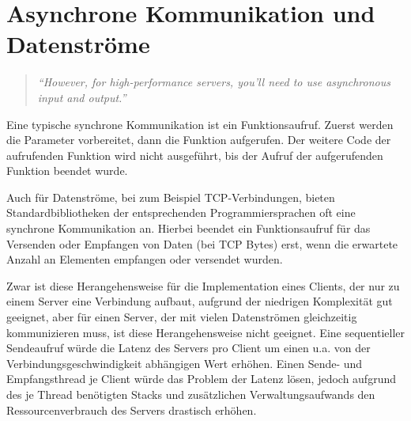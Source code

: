 	
	
	


\section{Asynchrone Kommunikation und Datenströme}

\begin{quotation}
	\textit{\enquote{However, for high-performance servers, you'll need to use asynchronous input and output.}}
	\cite[454]{rust:orly_programming}
\end{quotation}

Eine typische synchrone Kommunikation ist ein Funktionsaufruf.
Zuerst werden die Parameter vorbereitet, dann die Funktion aufgerufen.
Der weitere Code der aufrufenden Funktion wird nicht ausgeführt, bis der Aufruf der aufgerufenden Funktion beendet wurde.

Auch für Datenströme, bei zum Beispiel TCP-Verbindungen, bieten Standardbibliotheken der entsprechenden Programmiersprachen oft eine synchrone Kommunikation an.
Hierbei beendet ein Funktionsaufruf für das Versenden oder Empfangen von Daten (bei TCP Bytes) erst, wenn die erwartete Anzahl an Elementen empfangen oder versendet wurden.

Zwar ist diese Herangehensweise für die Implementation eines Clients, der nur zu einem Server eine Verbindung aufbaut, aufgrund der niedrigen Komplexität gut geeignet, aber für einen Server, der mit vielen Datenströmen gleichzeitig kommunizieren muss, ist diese Herangehensweise nicht geeignet.
Eine sequentieller Sendeaufruf würde die Latenz des Servers pro Client um einen u.a. von der Verbindungsgeschwindigkeit abhängigen Wert erhöhen.
Einen Sende- und Empfangsthread je Client würde das Problem der Latenz lösen, jedoch aufgrund des je Thread benötigten Stacks und zusätzlichen Verwaltungsaufwands den Ressourcenverbrauch des Servers drastisch erhöhen.

